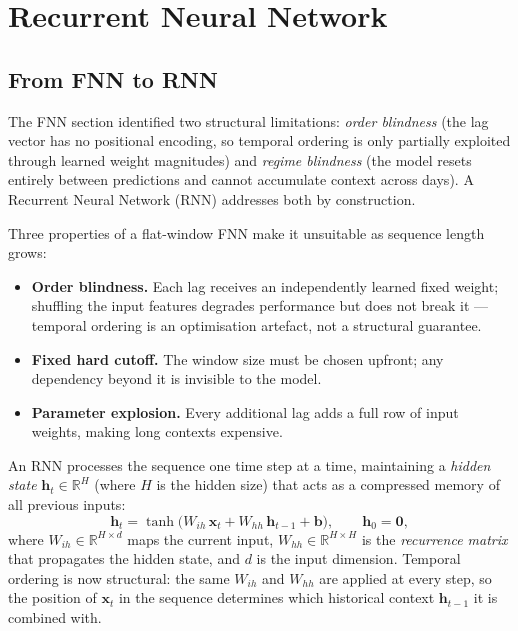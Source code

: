 \section{Recurrent Neural Network}
\label{sec:rnn}

\subsection{From FNN to RNN}

The FNN section identified two structural limitations: \emph{order blindness}
(the lag vector has no positional encoding, so temporal ordering is only
partially exploited through learned weight magnitudes) and \emph{regime
blindness} (the model resets entirely between predictions and cannot accumulate
context across days). A Recurrent Neural Network (RNN) addresses both
by construction.

Three properties of a flat-window FNN make it unsuitable as sequence length
grows:
\begin{itemize}
  \item \textbf{Order blindness.} Each lag receives an independently learned
        fixed weight; shuffling the input features degrades performance but
        does not break it — temporal ordering is an optimisation artefact,
        not a structural guarantee.
  \item \textbf{Fixed hard cutoff.} The window size must be chosen upfront;
        any dependency beyond it is invisible to the model.
  \item \textbf{Parameter explosion.} Every additional lag adds a full row of
        input weights, making long contexts expensive.
\end{itemize}

An RNN processes the sequence one time step at a time, maintaining a
\emph{hidden state} $\mathbf{h}_t \in \mathbb{R}^{H}$ (where $H$ is the hidden
size) that acts as a compressed memory of all previous inputs:
\[
  \mathbf{h}_t
  = \tanh\!\bigl(W_{ih}\,\mathbf{x}_t + W_{hh}\,\mathbf{h}_{t-1} + \mathbf{b}\bigr),
  \qquad \mathbf{h}_0 = \mathbf{0},
\]
where $W_{ih} \in \mathbb{R}^{H \times d}$ maps the current input,
$W_{hh} \in \mathbb{R}^{H \times H}$ is the \emph{recurrence matrix} that
propagates the hidden state, and $d$ is the input dimension.
Temporal ordering is now structural: the same $W_{ih}$ and $W_{hh}$ are
applied at every step, so the position of $\mathbf{x}_t$ in the sequence
determines which historical context $\mathbf{h}_{t-1}$ it is combined with.

